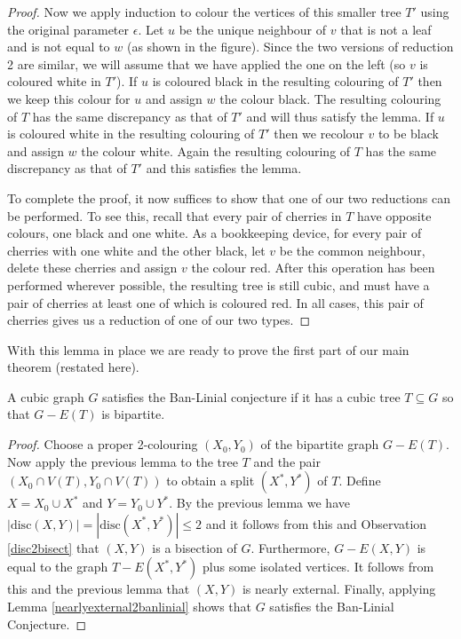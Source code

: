 \documentclass[12pt]{article}
\begin{document}
\begin{proof}
Now we apply induction to colour the vertices of this smaller tree $T'$ using the original parameter $\epsilon$.  Let $u$ be the unique neighbour of $v$ that is not a leaf and is not equal to $w$ (as shown in the figure).  Since the two versions of reduction 2 are similar, we will assume that we have applied the one on the left (so $v$ is coloured white in $T'$).  If $u$ is coloured black in the resulting colouring of $T'$ then we keep this colour for $u$ and assign $w$ the colour black.  The resulting colouring of $T$ has the same discrepancy as that of $T'$ and will thus satisfy the lemma.  If $u$ is coloured white in the resulting colouring of $T'$ then we recolour $v$ to be black and assign $w$ the colour white.  Again the resulting colouring of $T$ has the same discrepancy as that of $T'$ and this satisfies the lemma.  

\bigskip

To complete the proof, it now suffices to show that one of our two reductions can be performed.  To see this, recall that every pair of cherries in $T$ have opposite colours, one black and one white.  As a bookkeeping device, for every pair of cherries with one white and the other black, let $v$ be the common neighbour, delete these cherries and assign $v$ the colour red.   After this operation has been performed wherever possible, the resulting tree is still cubic, and must have a pair of cherries at least one of which is coloured red.  In all cases, this pair of cherries gives us a reduction of one of our two types.
\end{proof}

With this lemma in place we are ready to prove the first part of our main theorem (restated here).

\begin{theorem}\label{treeBip}
A cubic graph $G$ satisfies the Ban-Linial conjecture if it has a cubic tree $T \subseteq G$ so that $G - E(T)$ is bipartite.
\end{theorem}

\begin{proof}
Choose a proper 2-colouring $(X_0,Y_0)$ of the bipartite graph $G - E(T)$.  Now apply the previous lemma to the tree $T$ and the pair $(X_0 \cap V(T), Y_0 \cap V(T))$ to obtain a split $(X^*,Y^*)$ of $T$.  Define $X = X_0 \cup X^*$ and $Y = Y_0 \cup Y^*$.  By the previous lemma we have $|\mathrm{disc}(X,Y)| = |\mathrm{disc}(X^*,Y^*)| \le 2$ and it follows from this and Observation \ref{disc2bisect} that $(X,Y)$ is a bisection of $G$.  Furthermore, $G - E(X,Y)$ is equal to the graph $T - E(X^*,Y^*)$ plus some isolated vertices.  It follows from this and the previous lemma that $(X,Y)$ is nearly external.  Finally, applying Lemma \ref{nearlyexternal2banlinial} shows that $G$ satisfies the Ban-Linial Conjecture.
\end{proof}
\end{document}

